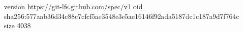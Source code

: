 version https://git-lfs.github.com/spec/v1
oid sha256:577aab36d34c88c7cfcf5ae3548e3e5ae16146f92ada5187dc1c187a9d7f764c
size 4038
